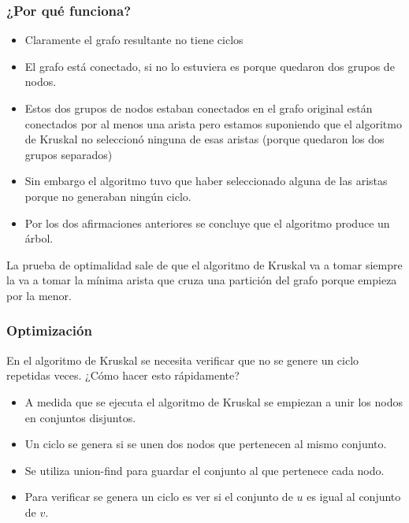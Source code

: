 \documentclass{beamer}
\begin{document}
	\begin{frame}
		\frametitle{¿Por qué funciona?}
		\begin{itemize}
			\item Claramente el grafo resultante no tiene ciclos
			\item El grafo está conectado, si no lo estuviera es porque quedaron dos grupos de nodos.
			\item Estos dos grupos de nodos estaban conectados en el grafo original están conectados por al menos una arista pero estamos suponiendo que el algoritmo de Kruskal no seleccionó ninguna de esas aristas (porque quedaron los dos grupos separados)
			\item Sin embargo el algoritmo tuvo que haber seleccionado alguna de las aristas porque no generaban ningún ciclo.
			\item Por los dos afirmaciones anteriores se concluye que el algoritmo produce un árbol.
		\end{itemize}
		La prueba de optimalidad sale de que el algoritmo de Kruskal va a tomar siempre la va a tomar la mínima arista que cruza una partición del grafo porque empieza por la menor.
	\end{frame}

	\begin{frame}
		\frametitle{Optimización}
		En el algoritmo de Kruskal se necesita verificar que no se genere un ciclo repetidas veces. ¿Cómo hacer esto rápidamente?
		\pause
		\begin{itemize}
			\item A medida que se ejecuta el algoritmo de Kruskal se empiezan a unir los nodos en conjuntos disjuntos.
			\item Un ciclo se genera si se unen dos nodos que pertenecen al mismo conjunto.
			\item Se utiliza union-find para guardar el conjunto al que pertenece cada nodo.
			\item Para verificar se genera un ciclo es ver si el conjunto de $u$ es igual al conjunto de $v$.
		\end{itemize}
	\end{frame}
\end{document}
